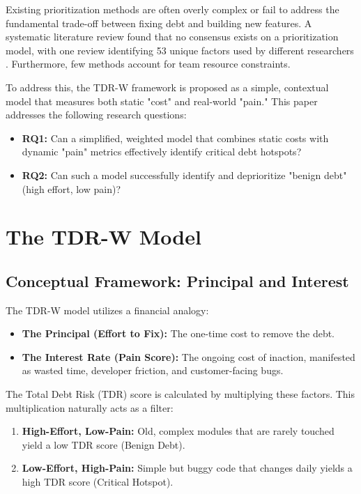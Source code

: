 \documentclass[conference]{IEEEtran}
\begin{document}
Existing prioritization methods are often overly complex or fail to address the fundamental trade-off between fixing debt and building new features. A systematic literature review found that no consensus exists on a prioritization model, with one review identifying 53 unique factors used by different researchers \cite{b4}. Furthermore, few methods account for team resource constraints.

To address this, the TDR-W framework is proposed as a simple, contextual model that measures both static "cost" and real-world "pain." This paper addresses the following research questions:

\begin{itemize}
    \item \textbf{RQ1:} Can a simplified, weighted model that combines static costs with dynamic "pain" metrics effectively identify critical debt hotspots?
    \item \textbf{RQ2:} Can such a model successfully identify and deprioritize "benign debt" (high effort, low pain)?
\end{itemize}

\section{The TDR-W Model}

\subsection{Conceptual Framework: Principal and Interest}
The TDR-W model utilizes a financial analogy:
\begin{itemize}
    \item \textbf{The Principal (Effort to Fix):} The one-time cost to remove the debt.
    \item \textbf{The Interest Rate (Pain Score):} The ongoing cost of inaction, manifested as wasted time, developer friction, and customer-facing bugs.
\end{itemize}

The Total Debt Risk (TDR) score is calculated by multiplying these factors. This multiplication naturally acts as a filter:
\begin{enumerate}
    \item \textbf{High-Effort, Low-Pain:} Old, complex modules that are rarely touched yield a low TDR score (Benign Debt).
    \item \textbf{Low-Effort, High-Pain:} Simple but buggy code that changes daily yields a high TDR score (Critical Hotspot).
\end{enumerate}
\end{document}
